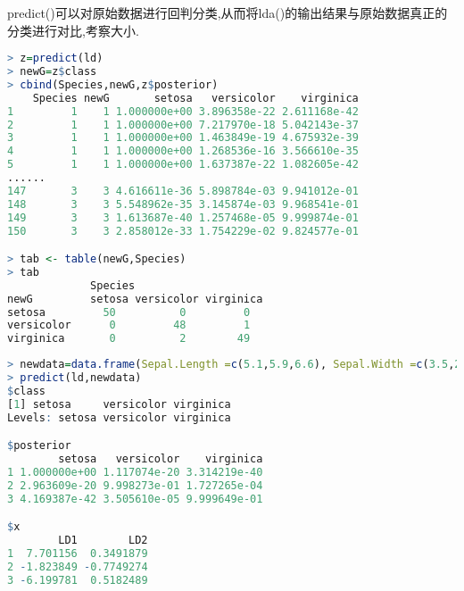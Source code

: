 \documentclass[11pt,a4paper,oneside]{book}
\begin{document}
predict()可以对原始数据进行回判分类,从而将lda()的输出结果与原始数据真正的分类进行对比,考察大小.
\begin{lstlisting}[language=r]
> z=predict(ld)
> newG=z$class
> cbind(Species,newG,z$posterior)
    Species newG       setosa   versicolor    virginica
1         1    1 1.000000e+00 3.896358e-22 2.611168e-42
2         1    1 1.000000e+00 7.217970e-18 5.042143e-37
3         1    1 1.000000e+00 1.463849e-19 4.675932e-39
4         1    1 1.000000e+00 1.268536e-16 3.566610e-35
5         1    1 1.000000e+00 1.637387e-22 1.082605e-42
......
147       3    3 4.616611e-36 5.898784e-03 9.941012e-01
148       3    3 5.548962e-35 3.145874e-03 9.968541e-01
149       3    3 1.613687e-40 1.257468e-05 9.999874e-01
150       3    3 2.858012e-33 1.754229e-02 9.824577e-01

> tab <- table(newG,Species)
> tab
             Species
newG         setosa versicolor virginica
setosa         50          0         0
versicolor      0         48         1
virginica       0          2        49
\end{lstlisting}
\begin{lstlisting}[language=r]
> newdata=data.frame(Sepal.Length =c(5.1,5.9,6.6), Sepal.Width =c(3.5,2.8,2.9),Petal.Length =c(1.5,4.3,5.6), Petal.Width =c(0.25,1.3,2.1))
> predict(ld,newdata)
$class
[1] setosa     versicolor virginica 
Levels: setosa versicolor virginica

$posterior
        setosa   versicolor    virginica
1 1.000000e+00 1.117074e-20 3.314219e-40
2 2.963609e-20 9.998273e-01 1.727265e-04
3 4.169387e-42 3.505610e-05 9.999649e-01

$x
        LD1        LD2
1  7.701156  0.3491879
2 -1.823849 -0.7749274
3 -6.199781  0.5182489
\end{lstlisting}
\end{document}
